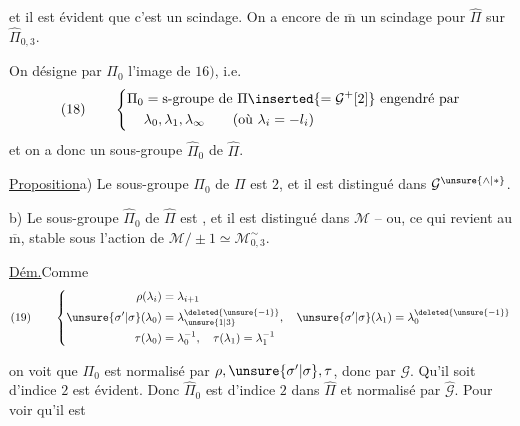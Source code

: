 et il est évident que c'est un scindage. On a encore de $\overline{\mathrm m}$ un scindage pour $\widehat\Pi$ sur $\widehat\Pi_{0,3}$.

On désigne par $\Pi_0$ l'image de $16)$, i.e.
\[
(18)\qquad
\left\{\begin{aligned}
\Pi_0&=\text{s-groupe de }\Pi\inserted{=\mathcal{G}^{+}[2]}\text{ engendré par}\\
&\lambda_0,\lambda_1,\lambda_\infty\qquad(\text{où }\lambda_i=-l_i)
\end{aligned}\right.
\]
et on a donc un sous-groupe $\widehat\Pi_0$ de $\widehat\Pi$.

\uline{Proposition}\quad a) Le sous-groupe $\Pi_0$ de $\Pi$ est  $2$, et il est distingué dans $\mathcal{G}^{\unsure{\wedge|*}}$.

b) Le sous-groupe $\widehat\Pi_0$ de $\widehat\Pi$ est , et il est distingué dans $\mathcal M$ -- ou, ce qui revient au $\overline{\mathrm m}$, stable sous l'action de $\mathcal M/\pm1\simeq\mathcal M_{0,3}^{\sim}$.

\uline{Dém.}\quad Comme
\[
(19)\qquad
\left\{\begin{aligned}
\rho(\lambda_i)&=\lambda_{i+1}\\
\unsure{\sigma'|\sigma}(\lambda_0)&=\lambda_{\unsure{1|3}}^{\deleted{\unsure{-1}}},\quad
\unsure{\sigma'|\sigma}(\lambda_1)=\lambda_0^{\deleted{\unsure{-1}}}\\
\tau(\lambda_0)&=\lambda_0^{-1},\quad\tau(\lambda_1)=\lambda_1^{-1}
\end{aligned}\right.
\]

on voit que $\Pi_0$ est  normalisé par $\rho,\unsure{\sigma'|\sigma},\tau$, donc par $\mathcal G$. Qu'il soit d'indice $2$ est évident. Donc $\widehat\Pi_0$ est d'indice $2$ dans $\widehat\Pi$ et normalisé par $\widehat{\mathcal G}$. Pour voir qu'il est


